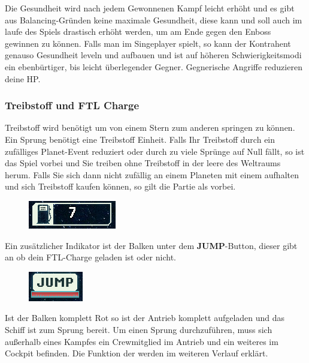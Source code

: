\documentclass[fontsize=12pt,paper=a4,twoside]{scrartcl}
\begin{document}
Die Gesundheit wird nach jedem Gewonnenen Kampf leicht erhöht und es gibt aus Balancing-Gründen keine maximale Gesundheit, diese kann und soll auch im laufe des Spiels drastisch erhöht werden, um am Ende gegen den Enboss gewinnen zu können.
Falls man im Singeplayer spielt, so kann der Kontrahent genauso Gesundheit leveln und aufbauen und ist auf höheren Schwierigkeitsmodi ein ebenbürtiger, bis leicht überlegender Gegner. Gegnerische Angriffe reduzieren deine HP.

\subsubsection{Treibstoff und FTL Charge}
Treibstoff wird benötigt um von einem Stern zum anderen springen zu können. Ein Sprung benötigt eine Treibstoff Einheit. Falls Ihr Treibstoff durch ein zufälliges Planet-Event reduziert oder durch zu viele Sprünge auf Null fällt, so ist das Spiel vorbei und Sie treiben ohne Treibstoff in der leere des Weltraums herum. Falls Sie sich dann nicht zufällig an einem Planeten mit einem  aufhalten und sich Treibstoff kaufen können, so gilt die Partie als vorbei.
\begin{figure}[H]
\centering
\includegraphics[width=0.4\linewidth]{DasSpiel/Ui/fuel.png}
\end{figure}
Ein zusätzlicher Indikator ist der Balken unter dem \textbf{JUMP}-Button, dieser gibt an ob dein FTL-Charge geladen ist oder nicht. 
\begin{figure}[H]
\centering
\includegraphics[width=0.4\linewidth]{DasSpiel/Ui/ftl_charge.png}
\end{figure}
Ist der Balken komplett Rot so ist der Antrieb komplett aufgeladen und das Schiff ist zum Sprung bereit. Um einen Sprung durchzuführen, muss sich außerhalb eines Kampfes ein Crewmitglied im Antrieb und ein weiteres im Cockpit befinden. Die Funktion der  werden im weiteren Verlauf erklärt.\\
\end{document}
